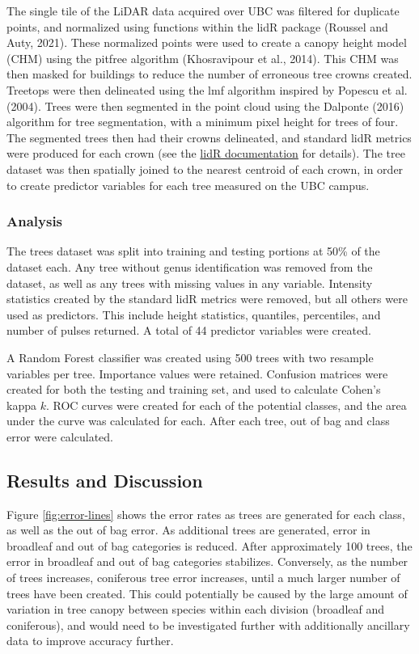 \documentclass[
]{article}
\begin{document}
The single tile of the LiDAR data acquired over UBC was filtered for duplicate points, and normalized using functions within the lidR package (Roussel and Auty, 2021). These normalized points were used to create a canopy height model (CHM) using the pitfree algorithm (Khosravipour et al., 2014). This CHM was then masked for buildings to reduce the number of erroneous tree crowns created. Treetops were then delineated using the lmf algorithm inspired by Popescu et al. (2004). Trees were then segmented in the point cloud using the Dalponte (2016) algorithm for tree segmentation, with a minimum pixel height for trees of four. The segmented trees then had their crowns delineated, and standard lidR metrics were produced for each crown (see the \href{https://rdrr.io/cran/lidR/man/stdmetrics.html}{lidR documentation} for details). The tree dataset was then spatially joined to the nearest centroid of each crown, in order to create predictor variables for each tree measured on the UBC campus.

\hypertarget{analysis}{%
\subsubsection{Analysis}\label{analysis}}

The trees dataset was split into training and testing portions at 50\% of the dataset each. Any tree without genus identification was removed from the dataset, as well as any trees with missing values in any variable. Intensity statistics created by the standard lidR metrics were removed, but all others were used as predictors. This include height statistics, quantiles, percentiles, and number of pulses returned. A total of 44 predictor variables were created.

A Random Forest classifier was created using 500 trees with two resample variables per tree. Importance values were retained. Confusion matrices were created for both the testing and training set, and used to calculate Cohen's kappa \(k\). ROC curves were created for each of the potential classes, and the area under the curve was calculated for each. After each tree, out of bag and class error were calculated.

\hypertarget{results-and-discussion}{%
\subsection{Results and Discussion}\label{results-and-discussion}}

Figure \ref{fig:error-lines} shows the error rates as trees are generated for each class, as well as the out of bag error. As additional trees are generated, error in broadleaf and out of bag categories is reduced. After approximately 100 trees, the error in broadleaf and out of bag categories stabilizes. Conversely, as the number of trees increases, coniferous tree error increases, until a much larger number of trees have been created. This could potentially be caused by the large amount of variation in tree canopy between species within each division (broadleaf and coniferous), and would need to be investigated further with additionally ancillary data to improve accuracy further.
\end{document}
